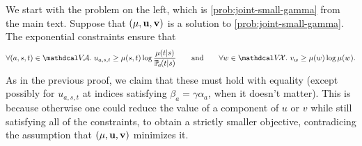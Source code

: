 \begin{subappendices}
\begin{lproof}\label{proof:joint-small-gamma-correct}
    We start with the problem on the left, which is \eqref{prob:joint-small-gamma} from the main text.
    Suppose that $(\mu, \mathbf u, \mathbf v)$ is a solution to \eqref{prob:joint-small-gamma}.
    The exponential constraints ensure that
    \[
        \forall (a,s,t) \in \V\!\Ar.~
        u_{a,s,t} \ge \mu(s,t) \log \frac{\mu(t|s)}{\p_a(t|s)}
    \qquad\text{and}\qquad
        \forall w \in \V\!\X.~
        v_{w} \ge \mu(w) \log \mu(w).
    \]
    As in the previous proof, we claim that these must hold with equality (except possibly for $u_{a,s,t}$ at indices satisfying $\beta_a = \gamma \alpha_a$, when it doesn't matter).
    This is because otherwise one could reduce the value of a component of $u$ or $v$ while still satisfying all of the constraints, to obtain a strictly smaller objective, contradicing the assumption that $(\mu, \mathbf u, \mathbf v)$ minimizes it.


\end{lproof}
\end{subappendices}
